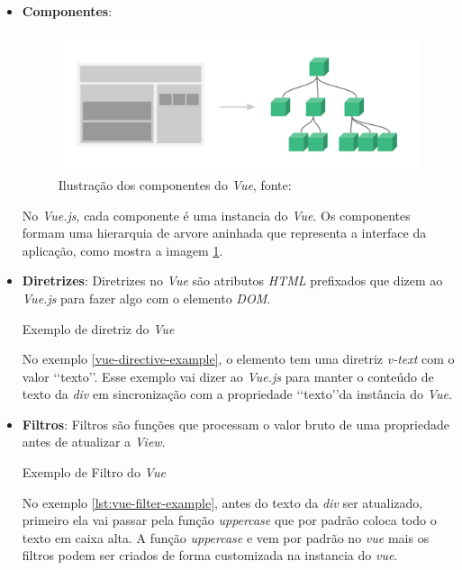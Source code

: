 \begin{itemize}
    \item \textbf{Componentes}:
    \begin{figure}[h]
        \centering
        \label{fig:vue-components}
        \includegraphics[keepaspectratio=true,scale=0.25]{figuras/vue-components.png}
        \caption{Ilustração dos componentes do \textit{Vue}, fonte: \cite{vuejs}}
    \end{figure}
    \par
    No \textit{Vue.js}, cada componente é uma instancia do \textit{Vue}. Os componentes formam uma hierarquia de arvore aninhada que representa a interface da aplicação, como mostra a imagem \ref{fig:vue-components}.
    \par
    \item \textbf{Diretrizes}:
    Diretrizes no \textit{Vue} são atributos \textit{HTML} prefixados que dizem ao \textit{Vue.js} para fazer algo com o elemento \textit{DOM}.
    \begin{listing}[H]
        \caption{Exemplo de diretriz do \textit{Vue}}
        \label{lst:vue-directive-example}
    \end{listing}
    No exemplo \ref{vue-directive-example}, o elemento tem uma diretriz \textit{v-text} com o valor \lq\lq texto\rq\rq. Esse exemplo vai dizer ao \textit{Vue.js} para manter o conteúdo de texto da \textit{div} em sincronização com a propriedade \lq\lq texto\rq\rq da instância do \textit{Vue}.
    \par
    \item \textbf{Filtros}:
    Filtros são funções que processam o valor bruto de uma propriedade antes de atualizar a \textit{View}.
        \begin{listing}[H]
            \caption{Exemplo de Filtro do \textit{Vue}}
            \label{lst:vue-filter-example}
        \end{listing}
    No exemplo \ref{lst:vue-filter-example}, antes do texto da \textit{div} ser atualizado, primeiro ela vai passar pela função \textit{uppercase} que por padrão coloca todo o texto em caixa alta. A função \textit{uppercase} e vem por padrão no \textit{vue} mais os filtros podem ser criados de forma customizada na instancia do \textit{vue}.
\end{itemize}
\newpage
